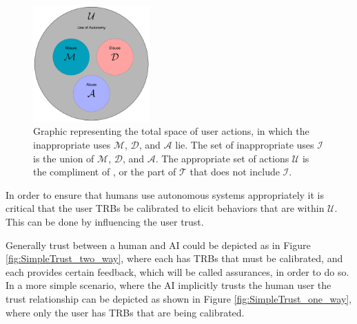 	\begin{figure}[htbp]
    	\centering
     	\includegraphics[width=0.4\textwidth]{Figures/misuse_disuse_abuse}
    	\caption{Graphic representing the total space of user actions, in which the inappropriate uses $\mathcal{M}$, $\mathcal{D}$, and $\mathcal{A}$ lie. The set of inappropriate uses $\mathcal{I}$ is the union of $\mathcal{M}$, $\mathcal{D}$, and $\mathcal{A}$. The appropriate set of actions $\mathcal{U}$ is the compliment of , or the part of $\mathcal{T}$ that does not include $\mathcal{I}$.}
        \label{fig:appropriate_use}
    \end{figure}
    
    In order to ensure that humans use autonomous systems appropriately it is critical that the user TRBs be calibrated to elicit behaviors that are within $\mathcal{U}$. This can be done by influencing the user trust.

    Generally trust between a human and AI could be depicted as in Figure \ref{fig:SimpleTrust_two_way}, where each has TRBs that must be calibrated, and each provides certain feedback, which will be called assurances, in order to do so. In a more simple scenario, where the AI implicitly trusts the human user the trust relationship can be depicted as shown in Figure \ref{fig:SimpleTrust_one_way}, where only the user has TRBs that are being calibrated.

